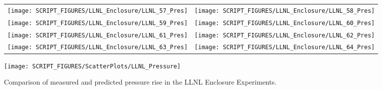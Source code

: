 \begin{figure}[p]
\begin{tabular*}{\textwidth}{l@{\extracolsep{\fill}}r}
\texttt{[image: SCRIPT\_FIGURES/LLNL\_Enclosure/LLNL\_57\_Pres]} &
\texttt{[image: SCRIPT\_FIGURES/LLNL\_Enclosure/LLNL\_58\_Pres]} \\
\texttt{[image: SCRIPT\_FIGURES/LLNL\_Enclosure/LLNL\_59\_Pres]} &
\texttt{[image: SCRIPT\_FIGURES/LLNL\_Enclosure/LLNL\_60\_Pres]} \\
\texttt{[image: SCRIPT\_FIGURES/LLNL\_Enclosure/LLNL\_61\_Pres]} &
\texttt{[image: SCRIPT\_FIGURES/LLNL\_Enclosure/LLNL\_62\_Pres]} \\
\texttt{[image: SCRIPT\_FIGURES/LLNL\_Enclosure/LLNL\_63\_Pres]} &
\texttt{[image: SCRIPT\_FIGURES/LLNL\_Enclosure/LLNL\_64\_Pres]}
\end{tabular*}
\label{LLNL_Enclosure_Pres_8}
\end{figure}

\begin{figure}[p]
\begin{center}
\texttt{[image: SCRIPT\_FIGURES/ScatterPlots/LLNL\_Pressure]} 
\end{center}
\caption[Summary of pressure predictions, LLNL Enclosure Experiments.]
{Comparison of measured and predicted pressure rise in the LLNL Enclosure Experiments.}
\end{figure}
